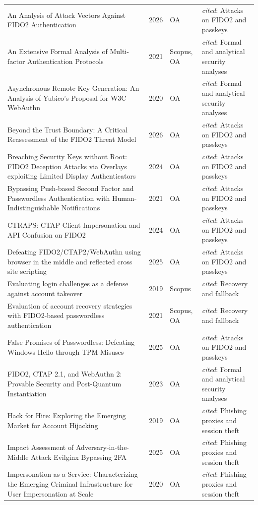 \begin{longtable}{@{}%
  >{\raggedright\arraybackslash}p{}c%
  >{\raggedright\arraybackslash}p{}%
  >{\raggedright\arraybackslash}p{}@{}}
An Analysis of Attack Vectors Against FIDO2 Authentication & 2026 & OA & \emph{cited}: Attacks on FIDO2 and passkeys \\
An Extensive Formal Analysis of Multi-factor Authentication Protocols & 2021 & Scopus, OA & \emph{cited}: Formal and analytical security analyses \\
Asynchronous Remote Key Generation: An Analysis of Yubico's Proposal for W3C WebAuthn & 2020 & OA & \emph{cited}: Formal and analytical security analyses \\
Beyond the Trust Boundary: A Critical Reassessment of the FIDO2 Threat Model & 2026 & OA & \emph{cited}: Attacks on FIDO2 and passkeys \\
Breaching Security Keys without Root: FIDO2 Deception Attacks via Overlays exploiting Limited Display Authenticators & 2024 & OA & \emph{cited}: Attacks on FIDO2 and passkeys \\
Bypassing Push-based Second Factor and Passwordless Authentication with Human-Indistinguishable Notifications & 2021 & OA & \emph{cited}: Attacks on FIDO2 and passkeys \\
CTRAPS: CTAP Client Impersonation and API Confusion on FIDO2 & 2024 & OA & \emph{cited}: Attacks on FIDO2 and passkeys \\
Defeating FIDO2/CTAP2/WebAuthn using browser in the middle and reflected cross site scripting & 2025 & OA & \emph{cited}: Attacks on FIDO2 and passkeys \\
Evaluating login challenges as a defense against account takeover & 2019 & Scopus & \emph{cited}: Recovery and fallback \\
Evaluation of account recovery strategies with FIDO2-based passwordless authentication & 2021 & Scopus, OA & \emph{cited}: Recovery and fallback \\
False Promises of Passwordless: Defeating Windows Hello through TPM Misuses & 2025 & OA & \emph{cited}: Attacks on FIDO2 and passkeys \\
FIDO2, CTAP 2.1, and WebAuthn 2: Provable Security and Post-Quantum Instantiation & 2023 & OA & \emph{cited}: Formal and analytical security analyses \\
Hack for Hire: Exploring the Emerging Market for Account Hijacking & 2019 & OA & \emph{cited}: Phishing proxies and session theft \\
Impact Assessment of Adversary-in-the-Middle Attack Evilginx Bypassing 2FA & 2025 & OA & \emph{cited}: Phishing proxies and session theft \\
Impersonation-as-a-Service: Characterizing the Emerging Criminal Infrastructure for User Impersonation at Scale & 2020 & OA & \emph{cited}: Phishing proxies and session theft \\

\end{longtable}
